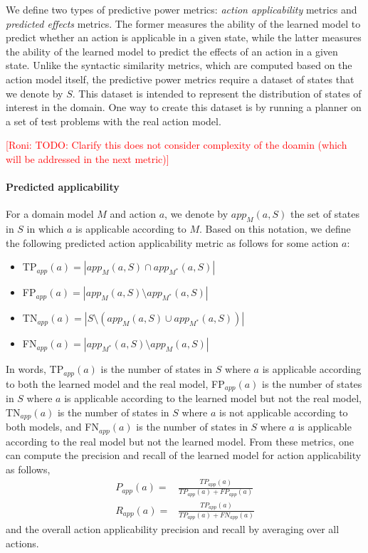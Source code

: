 \documentclass{article}
\theoremstyle{definition}
\theoremstyle{remark}
\newcommand{\realm}{\ensuremath{M^*}\xspace}
\newcommand{\app}{\ensuremath{\textit{app}}\xspace}
\newcommand{\roni}[1]{{\textcolor{red}{[Roni: #1]}}}
\begin{document}
We define two types of predictive power metrics: \emph{action applicability} metrics and \emph{predicted effects} metrics. 
The former measures the ability of the learned model to predict whether an action is applicable in a given state, while the latter measures the ability of the learned model to predict the effects of an action in a given state.
Unlike the syntactic similarity metrics, which are computed based on the action model itself, the predictive power metrics require a dataset of states that we denote by $S$. 
This dataset is intended to represent the distribution of states of interest in the domain. 
One way to create this dataset is by running a planner on a set of test problems with the real action model.

\roni{TODO: Clarify this does not consider complexity of the doamin (which will be addressed in the next metric)}

\paragraph{Predicted applicability}
For a domain model $M$ and action $a$, we denote by $\app_M(a,S)$ the set of states in $S$ in which $a$ is applicable according to $M$. Based on this notation, we define the following predicted action applicability metric as follows for some action $a$:
\begin{itemize}
    \item TP$_{\app}(a)=|\app_M(a,S)\cap \app_\realm(a,S)|$
    \item FP$_{\app}(a)=|\app_M(a,S)\setminus \app_\realm(a,S)|$ 
    \item TN$_{\app}(a)=|S\setminus (\app_M(a,S)\cup \app_\realm(a,S))|$
    \item FN$_{\app}(a)=|\app_\realm(a,S)\setminus \app_M(a,S)|$
\end{itemize}
In words, TP$_{\app}(a)$ is the number of states in $S$ where $a$ is applicable according to both the learned model and the real model, FP$_{\app}(a)$ is the number of states in $S$ where $a$ is applicable according to the learned model but not the real model, TN$_{\app}(a)$ is the number of states in $S$ where $a$ is not applicable according to both models, and FN$_{\app}(a)$ is the number of states in $S$ where $a$ is applicable according to the real model but not the learned model. 
From these metrics, one can compute the precision and recall of the learned model for action applicability as follows,
\begin{align}
    P_{\app}(a)= & \frac{TP_{\app}(a)}{TP_{\app}(a)+FP_{\app}(a)}\\
    R_{\app}(a)= & \frac{TP_{\app}(a)}{TP_{\app}(a)+FN_{\app}(a)}    
\end{align} 
and the overall action applicability precision and recall
by averaging over all actions.  
\end{document}

